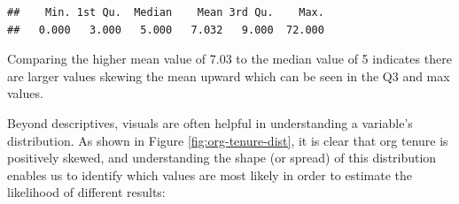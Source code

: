 \documentclass[
]{book}
\newenvironment{Shaded}{\begin{snugshade}}{\end{snugshade}}
\newcommand{\AttributeTok}[1]{\textcolor[rgb]{0.77,0.63,0.00}{#1}}
\newcommand{\CommentTok}[1]{\textcolor[rgb]{0.56,0.35,0.01}{\textit{#1}}}
\newcommand{\FloatTok}[1]{\textcolor[rgb]{0.00,0.00,0.81}{#1}}
\newcommand{\FunctionTok}[1]{\textcolor[rgb]{0.00,0.00,0.00}{#1}}
\newcommand{\NormalTok}[1]{#1}
\newcommand{\OtherTok}[1]{\textcolor[rgb]{0.56,0.35,0.01}{#1}}
\newcommand{\SpecialCharTok}[1]{\textcolor[rgb]{0.00,0.00,0.00}{#1}}
\newcommand{\StringTok}[1]{\textcolor[rgb]{0.31,0.60,0.02}{#1}}
\begin{document}
\begin{Shaded}
\end{Shaded}

\begin{verbatim}
##    Min. 1st Qu.  Median    Mean 3rd Qu.    Max. 
##   0.000   3.000   5.000   7.032   9.000  72.000
\end{verbatim}

Comparing the higher mean value of 7.03 to the median value of 5 indicates there are larger values skewing the mean upward which can be seen in the Q3 and max values.

Beyond descriptives, visuals are often helpful in understanding a variable's distribution. As shown in Figure \ref{fig:org-tenure-dist}, it is clear that org tenure is positively skewed, and understanding the shape (or spread) of this distribution enables us to identify which values are most likely in order to estimate the likelihood of different results:

\begin{Shaded}
\end{Shaded}
\end{document}
